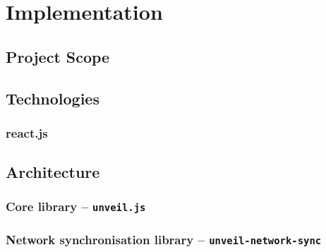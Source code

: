 \chapter{Implementation}
\label{cha:implementation}

\section{Project Scope}
\label{sec:implementation-scope}

\section{Technologies}
\label{sec:implementation-technologies}

\subsection{react.js}
\label{sec:implementation-architecture-react}

\section{Architecture}
\label{sec:implementation-architecture}

\subsection{Core library -- \texttt{unveil.js}}
\label{sec:implementation-architecture-core}

\subsection{Network synchronisation library -- \texttt{unveil-network-sync}}
\label{sec:implementation-architecture-network-sync}

